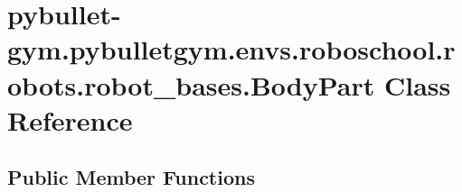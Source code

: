 \hypertarget{classpybullet-gym_1_1pybulletgym_1_1envs_1_1roboschool_1_1robots_1_1robot__bases_1_1_body_part}{}\section{pybullet-\/gym.pybulletgym.\+envs.\+roboschool.\+robots.\+robot\+\_\+bases.\+Body\+Part Class Reference}
\label{classpybullet-gym_1_1pybulletgym_1_1envs_1_1roboschool_1_1robots_1_1robot__bases_1_1_body_part}
\subsection*{Public Member Functions}
